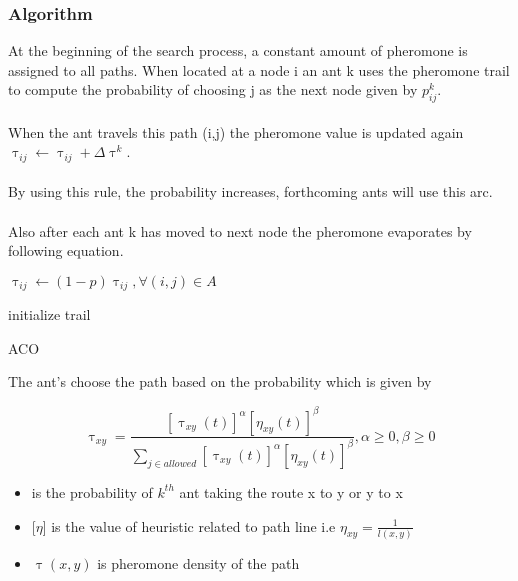 \documentclass[11pt]{article}
\begin{document}
\subsubsection{Algorithm}
At the beginning of the search process, a constant amount of pheromone is assigned to all paths. When located at a node i an ant k uses the pheromone trail to compute the probability of choosing j as the next node given by $p_{ij}^k$. \\ \\
When the ant travels this path (i,j) the pheromone value is updated again $\uptau_{ij}\leftarrow\uptau_{ij} + \Delta\uptau^{k}$.\\ \\
By using this rule, the probability increases, forthcoming ants will use this arc.\\ \\
Also after each ant k has moved to next node the pheromone evaporates by following equation.\\
\begin{center}$\uptau_{ij}\leftarrow(1 - p)\uptau_{ij}, \forall(i, j)\in A$ \end{center}
\begin{algorithm}[H]
\SetAlgoLined
 initialize trail\;
 \caption{\textsc{ACO}}
 \end{algorithm}
 The ant's choose the path based on the probability which is given by \\
\begin{center}
\Large
\begin{equation}
\uptau_{xy} = \frac{[\uptau_{xy}(t)]^{\alpha}[\eta_{xy}(t)]^{\beta}}{\sum\limits_{j \in allowed}
[\uptau_{xy}(t)]^{\alpha}[\eta_{xy}(t)]^{\beta}}, \alpha \geq 0,\beta \geq 0
\end{equation}
\end{center}
\begin{itemize} %
\item[]\hspace{6cm} is the probability of $k^{th}$ ant taking the route x to y or y to x
\item[] \hspace*{6cm} [$\eta$] is the value of heuristic related to path line i.e $\eta_{xy}=\frac{1}{l(x,y)}$
\item[] \hspace*{6cm}$\uptau(x,y)$ is pheromone density of the path
\end{itemize}
\end{document}
